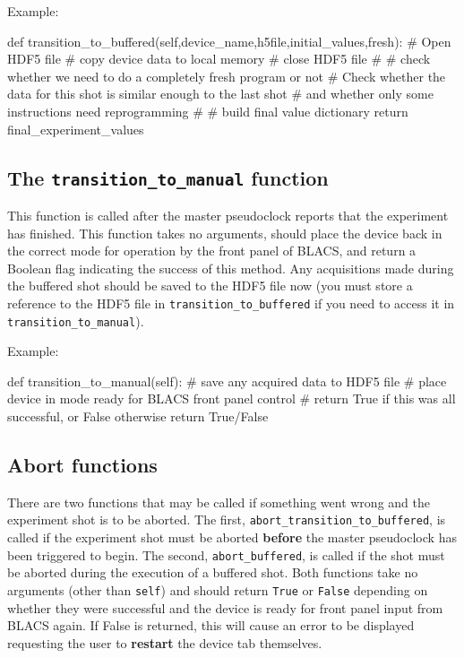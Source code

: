 \documentclass[12pt]{article}
\begin{document}
Example:
\begin{python}
    def transition_to_buffered(self,device_name,h5file,initial_values,fresh):
        # Open HDF5 file
        # copy device data to local memory
        # close HDF5 file
        #
        # check whether we need to do a completely fresh program or not
        # Check whether the data for this shot is similar enough to the last shot
        #       and whether only some instructions need reprogramming
        # 
        # build final value dictionary
        return final_experiment_values
\end{python}

\subsection{The \texttt{transition\_to\_manual} function}
This function is called after the master pseudoclock reports that the experiment has finished. 
This function takes no arguments, should place the device back in the correct mode for operation by the front panel of BLACS, and return a Boolean flag indicating the success of this method.
Any acquisitions made during the buffered shot should be saved to the HDF5 file now (you must store a reference to the HDF5 file in \texttt{transition\_to\_buffered} if you need to access it in \texttt{transition\_to\_manual}).

Example:
\begin{python}
    def transition_to_manual(self):
        # save any acquired data to HDF5 file
        # place device in mode ready for BLACS front panel control
        # return True if this was all successful, or False otherwise
        return True/False
\end{python}

\subsection{Abort functions}
There are two functions that may be called if something went wrong and the experiment shot is to be aborted.
The first, \texttt{abort\_transition\_to\_buffered}, is called if the experiment shot must be aborted \textbf{before} the master pseudoclock has been triggered to begin.
The second, \texttt{abort\_buffered}, is called if the shot must be aborted during the execution of a buffered shot.
Both functions take no arguments (other than \texttt{self}) and should return \texttt{True} or \texttt{False} depending on whether they were successful and the device is ready for front panel input from BLACS again.
If False is returned, this will cause an error to be displayed requesting the user to \textbf{restart} the device tab themselves. 
\end{document}
